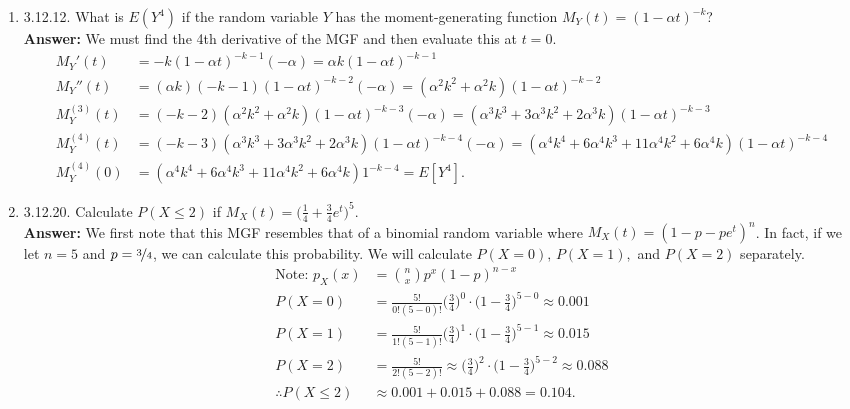 \documentclass{article}
\begin{document}
\begin{enumerate}
        \item 3.12.12. What is $E(Y^4)$ if the random variable $Y$ has the moment-generating function $M_Y(t) = (1-\alpha t)^{-k}$?\\
        \textbf{Answer: }We must find the 4th derivative of the MGF and then evaluate this at $t=0$.
            \begin{align*}
                M_Y'(t) &= -k(1-\alpha t)^{-k-1}(-\alpha) = \alpha k(1-\alpha t)^{-k-1}\\
                M_Y''(t) &= (\alpha k)(-k-1)(1- \alpha t)^{-k-2}(-\alpha) = (\alpha^2k^2+\alpha^2k)(1- \alpha t)^{-k-2}\\
                M_Y^{(3)}(t) &=  (-k-2)(\alpha^2k^2+\alpha^2k)(1-\alpha t)^{-k-3}(-\alpha) = (\alpha^3k^3+3\alpha^3k^2+2\alpha^3k)(1-\alpha t)^{-k-3}\\
                M_Y^{(4)}(t) &= (-k-3)(\alpha^3k^3+3\alpha^3k^2+2\alpha^3k)(1-\alpha t)^{-k-4}(-\alpha) = (\alpha^4k^4+6\alpha^4k^3+11\alpha^4k^2+6\alpha^4k)(1-\alpha t)^{-k-4}\\
                M_Y^{(4)}(0) &= (\alpha^4k^4+6\alpha^4k^3+11\alpha^4k^2+6\alpha^4k)1^{-k-4} = E[Y^4].
            \end{align*}
        
        \item 3.12.20. Calculate $P(X \leq 2)$ if $M_X(t) = \big( \frac{1}{4}+\frac{3}{4}e^t\big)^5$.\\
        \textbf{Answer: }We first note that this MGF resembles that of a binomial random variable where $M_X(t) = (1-p-pe^t)^n$. In fact, if we let $n=5$ and $p=\nicefrac{3}{4}$, we can calculate this probability. We will calculate $P(X=0),\,P(X=1),$ and $P(X=2)$ separately.
            \begin{align*}
                \text{Note: }p_X(x) &= {n \choose x}p^x(1-p)^{n-x}\\
                P(X=0) &= \frac{5!}{0!(5-0)!} \bigg(\frac{3}{4}\bigg)^0 \cdot \bigg(1-\frac{3}{4}\bigg)^{5-0} \approx 0.001\\
                P(X=1) &= \frac{5!}{1!(5-1)!} \bigg(\frac{3}{4}\bigg)^1 \cdot \bigg(1-\frac{3}{4}\bigg)^{5-1} \approx 0.015\\
                P(X=2) &= \frac{5!}{2!(5-2)!} \approx  \bigg(\frac{3}{4}\bigg)^2 \cdot \bigg(1-\frac{3}{4}\bigg)^{5-2} \approx 0.088\\
            \therefore P(X \leq 2) &\approx 0.001+0.015+0.088 = 0.104.
            \end{align*}
    \end{enumerate}
\end{document}
